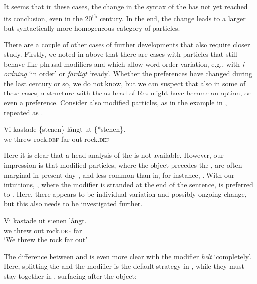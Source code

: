 \documentclass[output=paper]{langscibook}
\begin{document}
It seems that in these cases, the change in the syntax of the  has not yet reached its conclusion, even in the 20\textsuperscript{th} century. In the end, the change leads to a larger but syntactically more homogeneous category of particles. 



There are a couple of other cases of further developments that also require closer study. Firstly, we noted in  above that there are cases with particles that still behave like phrasal modifiers and which allow word order variation, e.g., with \textit{i ordning} ‘in order’ or \textit{färdigt} ‘ready’. Whether the preferences have changed during the last century or so, we do not know, but we can suspect that also in some of these cases, a structure with the  as head of Res might have become an option, or even a preference. Consider also modified particles, as in the example in , repeated as .\largerpage[-1.5]


\ea\label{ex:lalu:66}
\gll Vi     kastade \{stenen\}       långt    ut   \{*stenen\}.\\
we   threw     rock.\textsc{def}     far     out   rock.\textsc{def}\\
\z\pagebreak


Here it is clear that a head analysis of the  is not available. However, our impression is that modified particles, where the object precedes the , are often marginal in present-day , and less common than in, for instance, . With our intuitions, , where the modifier is stranded at the end of the sentence, is preferred to . Here, there appears to be individual variation and possibly ongoing change, but this also needs to be investigated further.


\ea\label{ex:lalu:67}
\gll  Vi     kastade   ut     stenen       långt.\\
we   threw     out     rock\textsc{.def}   far \\
\glt `We threw the rock far out'
\z


The difference between  and  is even more clear with the modifier \textit{helt} ‘completely’. Here, splitting the  and the modifier is the default strategy in , while they must stay together in , surfacing after the object:
\end{document}
